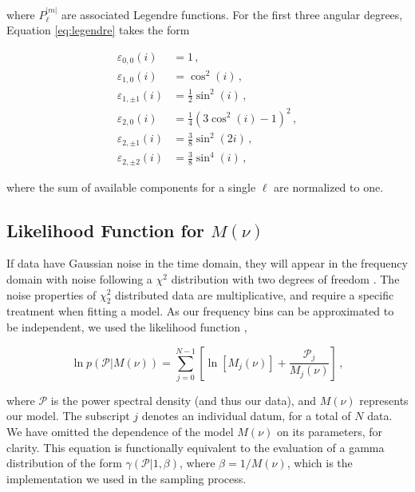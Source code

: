 \noindent where $P_\ell^{|m|}$ are associated Legendre functions. For the first three angular degrees, Equation \ref{eq:legendre} takes the form \cite{handberg+campante2011}

\begin{equation}
	\begin{split}
		\varepsilon_{0,0}(i) &= 1\, ,\\
		\varepsilon_{1,0}(i) &= \cos^2(i)\, ,    \\
		\varepsilon_{1,\pm1}(i) &= \frac{1}{2}\sin^2(i)\, ,\\
		\varepsilon_{2,0}(i) &= \frac{1}{4}(3\cos^2(i) - 1)^2\, ,\\
		\varepsilon_{2,\pm1}(i) &= \frac{3}{8}\sin^2(2i)\, ,\\
		\varepsilon_{2,\pm2}(i) &= \frac{3}{8}\sin^4(i)\, ,
	\end{split}
\end{equation}

\noindent where the sum of available components for a single $\ell$ are normalized to one.

\subsection{Likelihood Function for $M(\nu)$}\label{sec:like}
If data have Gaussian noise in the time domain, they will appear in the frequency domain with noise following a $\chi^2$ distribution with two degrees of freedom \cite[$\chi^2_2$ hereafter]{appourchaux+1998}. The noise properties of $\chi^2_2$ distributed data are multiplicative, and require a specific treatment when fitting a model. As our frequency bins can be approximated to be independent, we used the likelihood function \cite{anderson+1990},

\begin{equation}
	\ln p(\mathcal{P} | M(\nu)) = \sum_{j=0}^{N-1} \left[\ln[M_j(\nu)] + \frac{\mathcal{P}_j}{M_j(\nu)}\right]\, , 
\end{equation}

\noindent where $\mathcal{P}$ is the power spectral density (and thus our data), and $M(\nu)$ represents our model. The subscript $j$ denotes an individual datum, for a total of $N$ data. We have omitted the dependence of the model $M(\nu)$ on its parameters, for clarity. This equation is functionally equivalent to the evaluation of a gamma distribution of the form $\gamma(\mathcal{P} | 1, \beta)$, where $\beta = 1/M(\nu)$, which is the implementation we used in the sampling process.

